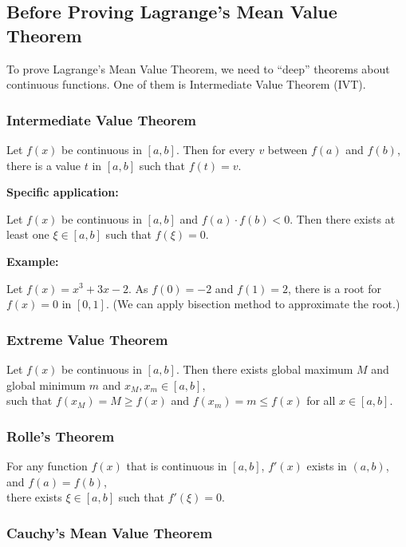 \subsection{Before Proving Lagrange's Mean Value Theorem}

To prove Lagrange's Mean Value Theorem, we need to ``deep'' theorems about continuous functions. One of them is Intermediate Value Theorem (IVT).

\subsubsection{Intermediate Value Theorem}

Let $f(x)$ be continuous in $[a, b]$. Then for every $v$ between $f(a)$ and $f(b)$, there is a value $t$ in $[a, b]$ such that $f(t) = v$.

\textbf{Specific application:}

Let $f(x)$ be continuous in $[a, b]$ and $f(a) \cdot f(b) < 0$. Then there exists at least one $\xi \in [a, b]$ such that $f(\xi) = 0$.

\textbf{Example:}

Let $f(x) = x^3 + 3x - 2$. As $f(0) = -2$ and $f(1) = 2$, there is a root for $f(x) = 0$ in $[0, 1]$. (We can apply bisection method to approximate the root.)

\subsubsection{Extreme Value Theorem}

Let $f(x)$ be continuous in $[a, b]$. Then there exists global maximum $M$ and global minimum $m$ and $x_M, x_m \in [a, b]$,\\
such that $f(x_M) = M \geq f(x)$ and $f(x_m) = m \leq f(x)$ for all $x \in [a, b]$.

\subsubsection{Rolle's Theorem}

For any function $f(x)$ that is continuous in $[a, b]$, $f'(x)$ exists in $(a, b)$, and $f(a) = f(b)$,\\
there exists $\xi \in [a, b]$ such that $f'(\xi) = 0$.

\subsubsection{Cauchy's Mean Value Theorem}

